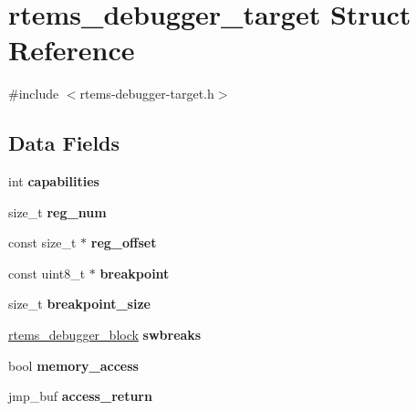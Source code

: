 \hypertarget{structrtems__debugger__target}{}\section{rtems\+\_\+debugger\+\_\+target Struct Reference}
\label{structrtems__debugger__target}


{\ttfamily \#include $<$rtems-\/debugger-\/target.\+h$>$}

\subsection*{Data Fields}
\begin{DoxyCompactItemize}
\item 
\mbox{\label{structrtems__debugger__target_a37dbaff1210fc6880944d8ea19f02ce1}} 
int {\bfseries capabilities}
\item 
\mbox{\label{structrtems__debugger__target_a03cae0a5d71ed36a2dd6640397f04964}} 
size\+\_\+t {\bfseries reg\+\_\+num}
\item 
\mbox{\label{structrtems__debugger__target_ac60eccde73614b0393238dd94d307e8f}} 
const size\+\_\+t $\ast$ {\bfseries reg\+\_\+offset}
\item 
\mbox{\label{structrtems__debugger__target_ada58a52bffe495426c9225ec05b9b388}} 
const uint8\+\_\+t $\ast$ {\bfseries breakpoint}
\item 
\mbox{\label{structrtems__debugger__target_acd643a6c35f82bf31e4482b867063f1e}} 
size\+\_\+t {\bfseries breakpoint\+\_\+size}
\item 
\mbox{\label{structrtems__debugger__target_a0b2f9923b476d027177aaac01f561781}} 
\mbox{\hyperlink{structrtems__debugger__block}{rtems\+\_\+debugger\+\_\+block}} {\bfseries swbreaks}
\item 
\mbox{\label{structrtems__debugger__target_a9f9cc7925fd4fde9676e517913c29138}} 
bool {\bfseries memory\+\_\+access}
\item 
\mbox{\label{structrtems__debugger__target_a29f8a108ded181d6062ee790acb42374}} 
jmp\+\_\+buf {\bfseries access\+\_\+return}
\end{DoxyCompactItemize}


